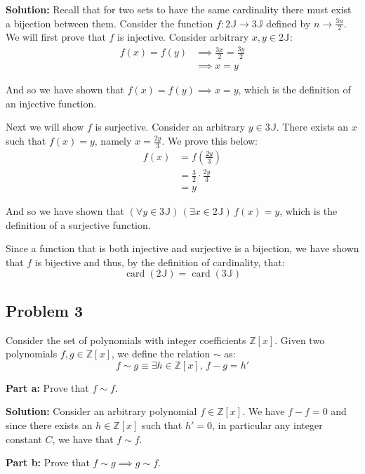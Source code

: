 \documentclass{article}
\newcommand{\posint}{\mathbb J}
\newcommand{\card}[1]{\operatorname{card}(#1)}
\begin{document}
\noindent\textbf{Solution:} Recall that for two sets to have the same cardinality there must exist a bijection between them. Consider the function $f:2\posint\to3\posint$ defined by $n\to\frac{3n}{2}$. We will first prove that $f$ is injective. Consider arbitrary $x,y\in2\posint$:
\begin{align*}
    f(x)=f(y)&\implies\frac{3x}{2}=\frac{3y}{2}\tag{def. of $f$}\\
    &\implies x=y\tag{algebra}
\end{align*}

And so we have shown that $f(x)=f(y)\implies x=y$, which is the definition of an injective function.

Next we will show $f$ is surjective. Consider an arbitrary $y\in3\posint$. There exists an $x$ such that $f(x)=y$, namely $x=\frac{2y}{3}$. We prove this below:
\begin{align*}
    f(x)&=f\left(\frac{2y}{3}\right)\tag{def. of $x$}\\
    &=\frac{3}{2}\cdot\frac{2y}{3}\tag{def. of $f$}\\
    &=y
\end{align*}

And so we have shown that $(\forall y\in3\posint)\,(\exists x\in2\posint)\,f(x)=y$, which is the definition of a surjective function.

Since a function that is both injective and surjective is a bijection, we have shown that $f$ is bijective and thus, by the definition of cardinality, that:
$$\card{2\posint}=\card{3\posint}$$

\subsection*{Problem 3}
Consider the set of polynomials with integer coefficients $\mathbb Z[x]$. Given two polynomials $f,g\in\mathbb Z[x]$, we define the relation $\sim$ as:
\begin{equation*}
    f\sim g\equiv \exists h\in\mathbb Z[x],\,f-g=h'
\end{equation*}

\noindent\textbf{Part a:} Prove that $f\sim f$.
\bigskip

\noindent\textbf{Solution:} Consider an arbitrary polynomial $f\in\mathbb Z[x]$. We have $f-f=0$ and since there exists an $h\in\mathbb Z[x]$ such that $h'=0$, in particular any integer constant $C$, we have that $f\sim f$.
\bigskip

\noindent\textbf{Part b:} Prove that $f\sim g\implies g\sim f$.
\bigskip
\end{document}
